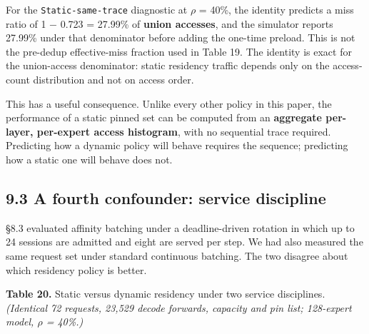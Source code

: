 \documentclass[
  10pt,
  letterpaper,
  10pt]{article}
\begin{document}
For the \texttt{Static-same-trace} diagnostic at \(\rho\) = 40\%, the
identity predicts a miss ratio of 1 \(-\) 0.723 = 27.99\% of
\textbf{union accesses}, and the simulator reports 27.99\% under that
denominator before adding the one-time preload. This is not the
pre-dedup effective-miss fraction used in Table 19. The identity is
exact for the union-access denominator: static residency traffic depends
only on the access-count distribution and not on access order.

This has a useful consequence. Unlike every other policy in this paper,
the performance of a static pinned set can be computed from an
\textbf{aggregate per-layer, per-expert access histogram}, with no
sequential trace required. Predicting how a dynamic policy will behave
requires the sequence; predicting how a static one will behave does not.

\subsection{9.3 A fourth confounder: service
discipline}\label{a-fourth-confounder-service-discipline}

§8.3 evaluated affinity batching under a deadline-driven rotation in
which up to 24 sessions are admitted and eight are served per step. We
had also measured the same request set under standard continuous
batching. The two disagree about which residency policy is better.

\textbf{Table 20.} Static versus dynamic residency under two service
disciplines. \emph{(Identical 72 requests, 23,529 decode forwards,
capacity and pin list; 128-expert model, \(\rho\) = 40\%.)}
\end{document}
